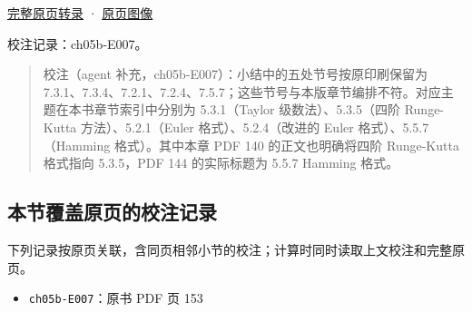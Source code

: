 \documentclass[
  10pt,
  fontset=fandol]{ctexart}
\providecommand{\tightlist}{%
  \setlength{\itemsep}{0pt}\setlength{\parskip}{0pt}}
\begin{document}
\href{../pages/pdf-153.md}{完整原页转录} · \href{../../source-images/pdf-153.jpeg}{原页图像}

校注记录：ch05b-E007。

\begin{quote}
校注（agent 补充，ch05b-E007）：小结中的五处节号按原印刷保留为 7.3.1、7.3.4、7.2.1、7.2.4、7.5.7；这些节号与本版章节编排不符。对应主题在本书章节索引中分别为 5.3.1（Taylor 级数法）、5.3.5（四阶 Runge-Kutta 方法）、5.2.1（Euler 格式）、5.2.4（改进的 Euler 格式）、5.5.7（Hamming 格式）。其中本章 PDF 140 的正文也明确将四阶 Runge-Kutta 格式指向 5.3.5，PDF 144 的实际标题为 5.5.7 Hamming 格式。
\end{quote}

\subsection{本节覆盖原页的校注记录}\label{ux672cux8282ux8986ux76d6ux539fux9875ux7684ux6821ux6ce8ux8bb0ux5f55}

下列记录按原页关联，含同页相邻小节的校注；计算时同时读取上文校注和完整原页。

\begin{itemize}
\tightlist
\item
  \texttt{ch05b-E007}：原书 PDF 页 153
\end{itemize}
\end{document}
